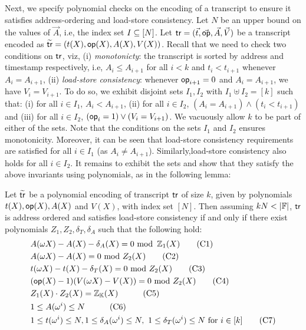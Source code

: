 Next, we specify polynomial checks on the encoding of a transcript to ensure it satisfies address-ordering and load-store consistency.
Let $N$ be an upper bound on the values of $\vec{A}$, i.e, the index set $I\subseteq [N]$.
Let $\mathsf{tr}=(\vec{t},\vec{\mathsf{op}},\vec{A},\vec{V})$ be a transcript encoded as
$\widetilde{\mathsf{tr}}=(t(X),\mathsf{op}(X),A(X),V(X))$. Recall that we need to check two conditions on $\mathsf{tr}$, viz, (i) {\em monotonicty}:
the transcript is sorted by address and timestamp respectively, i.e, $A_i\leq A_{i+1}$ for all $i < k$ and
$t_i < t_{i+1}$ whenever $A_i=A_{i+1}$, (ii) {\em load-store consistency}: whenever $\mathsf{op}_{i+1}=0$ and $A_i=A_{i+1}$,
we have $V_i=V_{i+1}$.
To do so, we exhibit disjoint sets $I_1,I_2$ with $I_1\uplus I_2=[k]$ such that: (i) for all
$i\in I_1$, $A_i < A_{i+1}$, (ii) for all $i\in I_2$, $(A_i = A_{i+1})\wedge (t_i < t_{i+1})$ and (iii) for all $i\in I_2$,
$(\mathsf{op}_i=1)\vee (V_i = V_{i+1})$. We vacuously allow $k$ to be part of either of the sets.
Note that the conditions on the sets $I_1$ and $I_2$ ensures monotonicity.
Moreover, it can be seen that load-store consistency requirements are satisfied for all $i\in I_1$ (as $A_i\neq A_{i+1}$).
Similarly,load-store consistency also holds for all $i\in I_2$.
It remains to exhibit the sets and show that they satisfy the above invariants using polynomials, as in the following
lemma:
\begin{lemma}\label{lem:addr-ordered-transcript}
Let $\widetilde{\mathsf{tr}}$ be a polynomial encoding of transcript $\mathsf{tr}$ of size $k$, given by polynomials $t(X),\mathsf{op}(X),A(X)$ and $V(X)$,
with index set $[N]$. Then assuming $kN<|\F|$, $\mathsf{tr}$ is address ordered and satisfies load-store consistency if and only if there exist polynomials
$Z_1,Z_2,\delta_T,\delta_A$
such that the following hold:
\begin{align}%
    & A(\omega X) - A(X) - \delta_A(X)= 0 \text{ mod }\, \mathbb{Z}_1(X) \tag{C1} \label{eq:C1} \\
    & A(\omega X) - A(X) = 0  \text{ mod } Z_2(X) \tag{C2} \label{eq:C2} \\
    & t(\omega X) - t(X) - \delta_T(X) = 0  \text{ mod } Z_2(X) \tag{C3} \label{eq:C3} \\
    & (\op(X) - 1)(V(\omega X) - V(X)) = 0  \text{ mod } Z_2(X) \tag{C4} \label{eq:C4} \\
    & Z_1(X)\cdot Z_2(X) = \mathbb{Z}_\setH(X) \quad  \tag{C5} \label{eq:C5} \\
    & 1\leq A(\omega^i) \leq N  \quad \tag{C6} \label{eq:C6} \\
    & 1\leq t(\omega^i) \leq N, 1\leq \delta_A(\omega^i)\leq N,\ 1\leq \delta_T(\omega^i)\leq N \text{ for } i\in [k] \tag{C7} \label{eq:C7}
\end{align}
\end{lemma}
